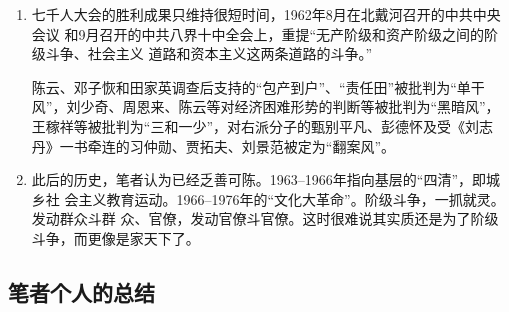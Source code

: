 \begin{enumerate}
\item 七千人大会的胜利成果只维持很短时间，1962年8月在北戴河召开的中共中央会议
  和9月召开的中共八界十中全会上，重提“无产阶级和资产阶级之间的阶级斗争、社会主义
  道路和资本主义这两条道路的斗争。”

陈云、邓子恢和田家英调查后支持的“包产到户”、“责任田”被批判为“单干风”，刘少奇、周恩来、陈云等对经济困难形势的判断等被批判为“黑暗风”，王稼祥等被批判为“三和一少”，对右派分子的甄别平凡、彭德怀及受《刘志丹》一书牵连的习仲勋、贾拓夫、刘景范被定为“翻案风”。

\item 此后的历史，笔者认为已经乏善可陈。1963--1966年指向基层的“四清”，即城乡社
  会主义教育运动。1966--1976年的“文化大革命”。阶级斗争，一抓就灵。发动群众斗群
  众、官僚，发动官僚斗官僚。这时很难说其实质还是为了阶级斗争，而更像是家天下了。
\end{enumerate}

\subsection{笔者个人的总结}

